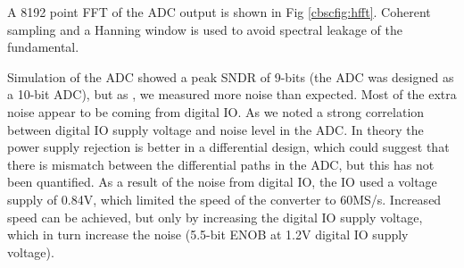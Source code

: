 A 8192 point FFT of the ADC output is shown in Fig \ref{cbscfig:hfft}. Coherent sampling and a Hanning
window is used to avoid spectral leakage of the fundamental. 



Simulation of the ADC showed a peak SNDR of 9-bits (the ADC was designed
as a 10-bit ADC), but as
\cite{brooks07a}, we measured more noise than expected. Most of the
extra noise appear to be coming from digital IO. As \cite{brooks07a} we noted a strong
correlation between digital IO supply voltage and noise level in the
ADC. In theory the power supply rejection is better in a differential
design, which could suggest that there is mismatch between the differential
paths in the ADC, but this has not been quantified. As a result of the
noise from digital IO, the IO used a voltage supply of 0.84V, which limited
the speed of the converter to 60MS/s. Increased speed can be
achieved, but only by increasing the digital IO supply voltage, which in turn
increase the noise (5.5-bit ENOB at 1.2V digital IO supply voltage).



